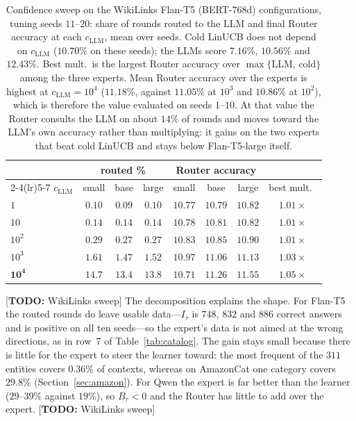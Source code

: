 \documentclass[anon]{alt2027} %
\newcommand{\todo}[1]{\textcolor{red!70!black}{[\textbf{TODO:} #1]}}
\begin{document}
\begin{table}[h]
\centering
\caption{Confidence sweep on the WikiLinks Flan-T5 (BERT-768d) configurations,
tuning seeds $11$--$20$: share of rounds routed to the LLM and final Router
accuracy at each $c_{\mathrm{LLM}}$, mean over seeds. Cold LinUCB does not depend on $c_{\mathrm{LLM}}$
($10.70\%$ on these seeds); the LLMs score $7.16\%$, $10.56\%$ and $12.43\%$.
Best mult.\ is the largest Router accuracy over $\max\{$LLM, cold$\}$ among the
three experts. Mean Router accuracy over the experts is highest at
$c_{\mathrm{LLM}}=10^4$ ($11.18\%$, against $11.05\%$ at $10^3$ and $10.86\%$ at $10^2$),
which is therefore the value evaluated on seeds $1$--$10$. At that value the
Router consults the LLM on about $14\%$ of rounds and moves toward the LLM's
own accuracy rather than multiplying: it gains on the two experts that beat
cold LinUCB and stays below Flan-T5-large itself.}
\label{tab:wiki-csweep}
\scriptsize
\setlength{\tabcolsep}{4pt}
\begin{tabular}{@{}lccccccc@{}}
\toprule
& \multicolumn{3}{c}{routed \%} & \multicolumn{3}{c}{Router accuracy} & \\
\cmidrule(lr){2-4}\cmidrule(lr){5-7}
$c_{\mathrm{LLM}}$ & small & base & large & small & base & large & best mult.\ \\
\midrule
$1$ & $0.10$ & $0.09$ & $0.10$ & $10.77$ & $10.79$ & $10.82$ & $1.01\times$ \\
$10$ & $0.14$ & $0.14$ & $0.14$ & $10.78$ & $10.81$ & $10.82$ & $1.01\times$ \\
$10^2$ & $0.29$ & $0.27$ & $0.27$ & $10.83$ & $10.85$ & $10.90$ & $1.01\times$ \\
$10^3$ & $1.61$ & $1.47$ & $1.52$ & $10.97$ & $11.06$ & $11.13$ & $1.03\times$ \\
$\mathbf{10^4}$ & $14.7$ & $13.4$ & $13.8$ & $10.71$ & $11.26$ & $\mathbf{11.55}$ & $\mathbf{1.05\times}$ \\
\bottomrule
\end{tabular}
\end{table}

\todo{WikiLinks sweep} The decomposition explains the shape. For Flan-T5 the routed rounds do leave
usable data---$I_\tau$ is $748$, $832$ and $886$ correct answers and is
positive on all ten seeds---so the expert's data is not aimed at the wrong
directions, as in row~7 of Table~\ref{tab:catalog}. The gain stays small
because there is little for the expert to steer the learner toward: the most
frequent of the $311$ entities covers $0.36\%$ of contexts, whereas on
AmazonCat one category covers $29.8\%$ (Section~\ref{sec:amazon}). For Qwen the expert is far better than the
learner ($29$--$39\%$ against $19\%$), so $B_\tau<0$ and the Router has
little to add over the expert. \todo{WikiLinks sweep}
\end{document}
